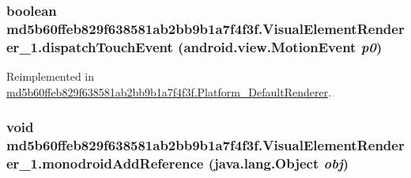 {\subsubsection[{dispatchTouchEvent}]{\setlength{\rightskip}{0pt plus 5cm}boolean md5b60ffeb829f638581ab2bb9b1a7f4f3f.VisualElementRenderer\_\-1.dispatchTouchEvent (android.view.MotionEvent {\em p0})}}
\label{classmd5b60ffeb829f638581ab2bb9b1a7f4f3f_1_1_visual_element_renderer__1_76b5ca405a881f2e09918f282c760285}




Reimplemented in \hyperlink{classmd5b60ffeb829f638581ab2bb9b1a7f4f3f_1_1_platform___default_renderer_c2385d55d3936317073c71eb3232886e}{md5b60ffeb829f638581ab2bb9b1a7f4f3f.Platform\_\-DefaultRenderer}.\hypertarget{classmd5b60ffeb829f638581ab2bb9b1a7f4f3f_1_1_visual_element_renderer__1_321b2967faff34b0f7971f55915f583e}{
\subsubsection[{monodroidAddReference}]{\setlength{\rightskip}{0pt plus 5cm}void md5b60ffeb829f638581ab2bb9b1a7f4f3f.VisualElementRenderer\_\-1.monodroidAddReference (java.lang.Object {\em obj})}}
\label{classmd5b60ffeb829f638581ab2bb9b1a7f4f3f_1_1_visual_element_renderer__1_321b2967faff34b0f7971f55915f583e}




